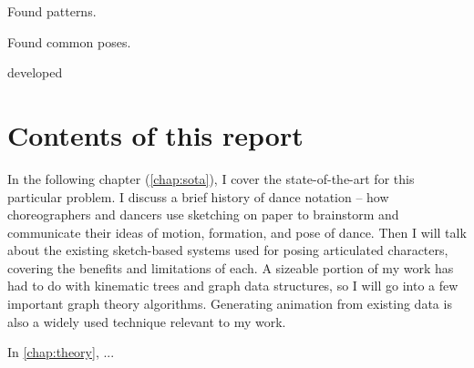 Found patterns.

Found common poses.

developed



\section{Contents of this report}

In the following chapter (\autoref{chap:sota}), I cover the state-of-the-art for this particular problem. I discuss a brief history of dance notation -- how choreographers and dancers use sketching on paper to brainstorm and communicate their ideas of motion, formation, and pose of dance. Then I will talk about the existing sketch-based systems used for posing articulated characters, covering the benefits and limitations of each. A sizeable portion of my work has had to do with kinematic trees and graph data structures, so I will go into a few important graph theory algorithms. Generating animation from existing data is also a widely used technique relevant to my work.

In \autoref{chap:theory}, ...

